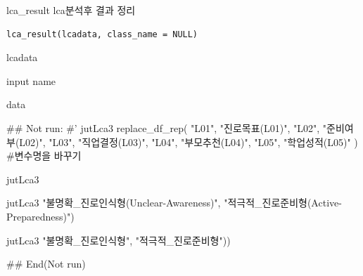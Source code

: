 \documentclass[a4paper]{book}
\begin{document}
%
\begin{Description}
lca\_result lca분석후 결과 정리
\end{Description}
%
\begin{Usage}
\begin{verbatim}
lca_result(lcadata, class_name = NULL)
\end{verbatim}
\end{Usage}
%
\begin{Arguments}
\begin{ldescription}
\item[\code{lcadata}] lcadata

\item[\code{class\_name}] input name
\end{ldescription}
\end{Arguments}
%
\begin{Value}
data
\end{Value}
%
\begin{Examples}
\begin{ExampleCode}
\#\# Not run: 
#'
jutLca3 %
  replace_df_rep( "L01", "진로목표(L01)",
                  "L02", "준비여부(L02)",
                  "L03", "직업결정(L03)",
                  "L04", "부모추천(L04)",
                  "L05", "학업성적(L05)" ) #변수명을 바꾸기

jutLca3 %

jutLca3 %
                                   "불명확_진로인식형\n(Unclear-Awareness)",
                                   "적극적_진로준비형\n(Active-Preparedness)")


                      jutLca3 %
                                                         "불명확_진로인식형",
                                                         "적극적_진로준비형"))


## End(Not run)
\end{ExampleCode}
\end{Examples}
\end{document}

